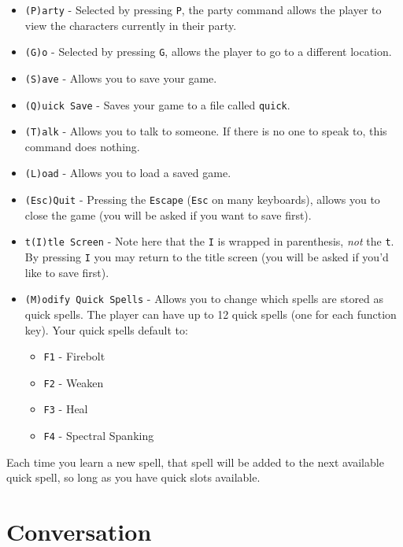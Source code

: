 \documentclass{report}
\begin{document}
    \begin{itemize}
        \item \verb|(P)arty| - Selected by pressing \verb|P|, the party command allows 
            the player to view the characters currently in their party.
        \item \verb|(G)o| - Selected by pressing \verb|G|, allows the player to go to
        a different location.
        \item \verb|(S)ave| - Allows you to save your game.
        \item \verb|(Q)uick Save| - Saves your game to a file called \verb|quick|.
        \item \verb|(T)alk| - Allows you to talk to someone. If there is no one to
            speak to, this command does nothing.
        \item \verb|(L)oad| - Allows you to load a saved game.
        \item \verb|(Esc)Quit| - Pressing the \verb|Escape| (\verb|Esc| on many 
        keyboards), allows you to close the game (you will be asked if you want to 
        save first).
        \item \verb|t(I)tle Screen| - Note here that the \verb|I| is wrapped in 
        parenthesis, \emph{not} the \verb|t|. By pressing \verb|I| you may return to
        the title screen (you will be asked if you'd like to save first).
        \item \verb|(M)odify Quick Spells|  - Allows you to change which spells are stored as quick spells. The player can have up to 12 quick spells (one for each function key). Your quick spells 
            default to:
            \begin{itemize}
                \item \verb|F1| - Firebolt
                \item \verb|F2| - Weaken
                \item \verb|F3| - Heal
                \item \verb|F4| - Spectral Spanking
            \end{itemize}
    \end{itemize}
    Each time you learn a new spell, that spell will be added to the next available quick spell, so long as you have quick slots available.

\section{Conversation}
\label{sec_conversation}
\end{document}
